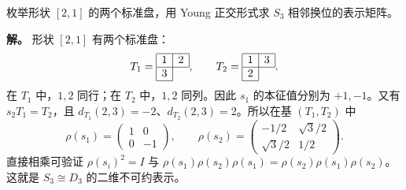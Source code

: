 \begin{example}
枚举形状 $[2,1]$ 的两个标准盘，用 Young 正交形式求 $S_3$ 相邻换位的表示矩阵。

\textbf{解。} 形状 $[2,1]$ 有两个标准盘：
\[
T_1=\begin{array}{|c|c|}\hline1&2\\\hline3\\\cline{1-1}\end{array},
\qquad
T_2=\begin{array}{|c|c|}\hline1&3\\\hline2\\\cline{1-1}\end{array}.
\]
在 $T_1$ 中，$1,2$ 同行；在 $T_2$ 中，$1,2$ 同列。因此 $s_1$ 的本征值分别为 $+1,-1$。又有 $s_2T_1=T_2$，且 $d_{T_1}(2,3)=-2$、$d_{T_2}(2,3)=2$。所以在基 $(T_1,T_2)$ 中
\[
\rho(s_1)=\begin{pmatrix}1&0\\0&-1\end{pmatrix},
\qquad
\rho(s_2)=\begin{pmatrix}-1/2&\sqrt3/2\\\sqrt3/2&1/2\end{pmatrix}.
\]
直接相乘可验证 $\rho(s_i)^2=I$ 与 $\rho(s_1)\rho(s_2)\rho(s_1)=\rho(s_2)\rho(s_1)\rho(s_2)$。这就是 $S_3\cong D_3$ 的二维不可约表示。
\end{example}

